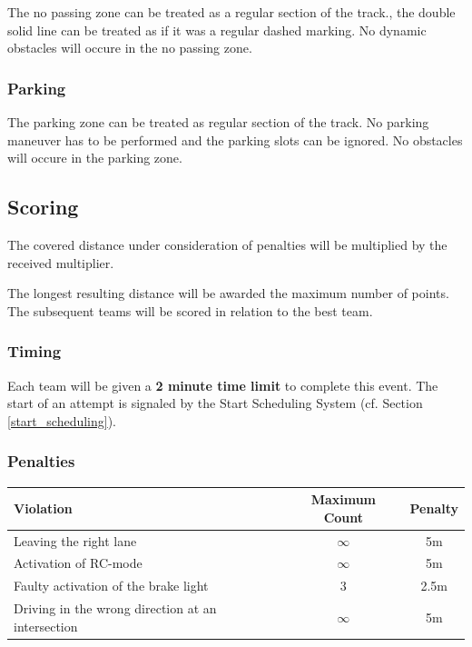 The no passing zone can be treated as a regular section of the track., the double solid line can be treated as if it was a regular dashed marking.
No dynamic obstacles will occure in the no passing zone.

\subsubsection{Parking}

The parking zone can be treated as regular section of the track.
No parking maneuver has to be performed and the parking slots can be ignored.
No obstacles will occure in the parking zone.

\subsection{Scoring}
\label{freedrive_scoring}

The covered distance under consideration of penalties will be multiplied by the received multiplier.

The longest resulting distance will be awarded the maximum number of points.
The subsequent teams will be scored in relation to the best team.

\subsubsection{Timing}

Each team will be given a \textbf{2 minute time limit} to complete this event.
The start of an attempt is signaled by the Start Scheduling System (cf. Section \ref{start_scheduling}).

\subsubsection{Penalties}
\label{freedrive_penalties}

\begin{table}[H]
	\begin{tabular}{@{}lcc@{}}
		\toprule
		\textbf{Violation}                                & \textbf{Maximum Count} & \textbf{Penalty} \\ \midrule
		Leaving the right lane                            & $\infty$               & 5m               \\
		Activation of RC-mode                             & $\infty$               & 5m               \\
		Faulty activation of the brake light              & 3                      & 2.5m              \\
		Driving in the wrong direction at an intersection & $\infty$               & 5m               \\
		\bottomrule
	\end{tabular}
\end{table}

